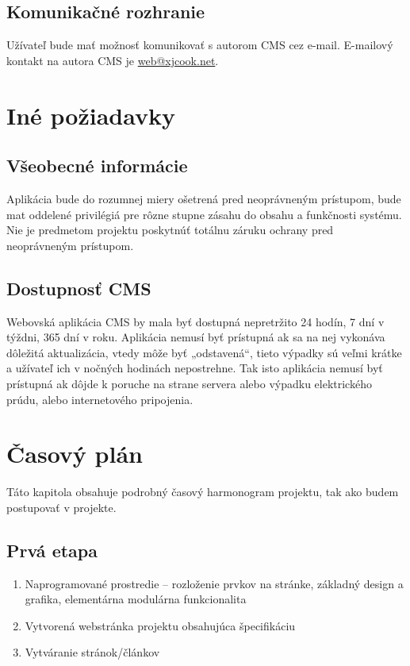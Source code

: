 \documentclass[a4paper,titlepage,11pt]{article}
\begin{document}
\subsection{Komunikačné rozhranie}
Užívateľ bude mať možnosť komunikovať s autorom CMS cez e-mail. E-mailový kontakt na autora CMS je \url{web@xjcook.net}.

\newpage
\section{Iné požiadavky}
\subsection{Všeobecné informácie}
Aplikácia bude do rozumnej miery ošetrená pred neoprávneným prístupom, bude mat oddelené privilégiá pre rôzne stupne zásahu do obsahu a funkčnosti systému. Nie je predmetom projektu poskytnúť totálnu záruku ochrany pred neoprávneným prístupom.
 
\subsection{Dostupnosť CMS}
Webovská aplikácia CMS by mala byť dostupná nepretržito 24 hodín, 7 dní v týždni, 365 dní v roku. 
Aplikácia nemusí byť prístupná ak sa na nej vykonáva dôležitá aktualizácia, vtedy môže byť „odstavená“, tieto výpadky sú veľmi krátke a užívateľ ich v nočných hodinách nepostrehne. 
Tak isto aplikácia nemusí byť prístupná ak dôjde k poruche na strane servera alebo výpadku elektrického prúdu, alebo internetového pripojenia.

\newpage
\section{Časový plán}
Táto kapitola obsahuje podrobný časový harmonogram projektu, tak ako budem postupovať v projekte. 

\subsection{Prvá etapa}
\begin{enumerate}
 \item Naprogramované prostredie -- rozloženie prvkov na stránke, základný design a grafika, elementárna modulárna funkcionalita
 \item Vytvorená webstránka projektu obsahujúca špecifikáciu 
 \item Vytváranie stránok\slash článkov
\end{enumerate}
\end{document}
